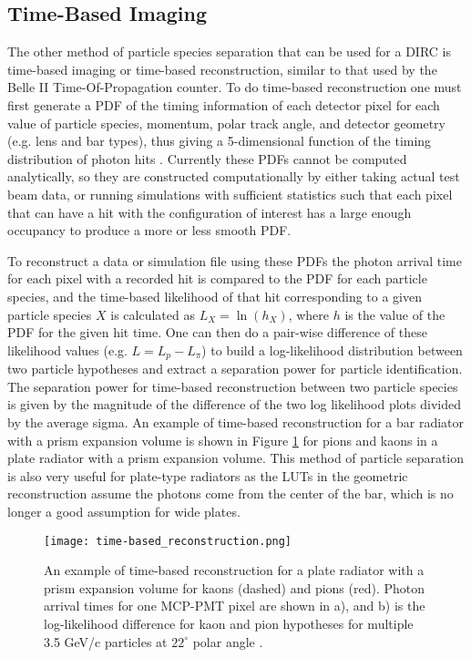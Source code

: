 \subsection{Time-Based Imaging}
The other method of particle species separation that can be used for a DIRC is time-based imaging or time-based reconstruction, similar to that used by the Belle II Time-Of-Propagation counter. To do time-based reconstruction one must first generate a PDF of the timing information of each detector pixel for each value of particle species, momentum, polar track angle, and detector geometry (e.g. lens and bar types), thus giving a 5-dimensional function  of the timing distribution of photon hits \cite{PANDA_barrel}. Currently these PDFs cannot be computed analytically, so they are constructed computationally by either taking actual test beam data, or running simulations with sufficient statistics such that each pixel that can have a hit with the configuration of interest has a large enough occupancy to produce a more or less smooth PDF.

To reconstruct a data or simulation file using these PDFs the photon arrival time for each pixel with a recorded hit is compared to the PDF for each particle species, and the time-based likelihood of that hit corresponding to a given particle species $X$ is calculated as $L_{X} = \ln(h_{X})$, where $h$ is the value of the PDF for the given hit time. One can then do a pair-wise difference of these likelihood values (e.g. $L = L_{p} - L_{\pi}$) to build a log-likelihood distribution between two particle hypotheses and extract a separation power for particle identification. The separation power for time-based reconstruction between two particle species is given by the magnitude of the difference of the two log likelihood plots divided by the average sigma. An example of time-based reconstruction for a bar radiator with a prism expansion volume is shown in Figure \ref{fig:time-based_reco} for pions and kaons in a plate radiator with a prism expansion volume. This method of particle separation is also very useful for plate-type radiators as the LUTs in the geometric reconstruction assume the photons come from the center of the bar, which is no longer a good assumption for wide plates. 

\begin{figure}[!htb]
	\centering
	\texttt{[image: time-based\_reconstruction.png]}
	\caption{An example of time-based reconstruction for a plate radiator with a prism expansion volume for kaons (dashed) and pions (red). Photon arrival times for one MCP-PMT pixel are shown in a), and b) is the log-likelihood difference for kaon and pion hypotheses for multiple 3.5 GeV/c particles at $22^\circ$ polar angle \cite{PANDA_barrel}.}
	\label{fig:time-based_reco}
\end{figure}
